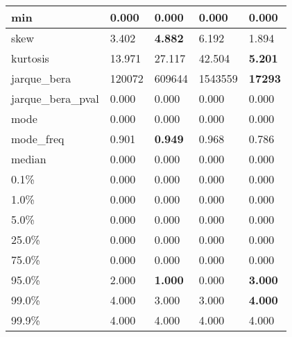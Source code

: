 \begin{table}[H]
\begin{tabular}{|l|m{10em}|m{10em}|m{10em}|m{10em}|}
\hline min & 0.000 & 0.000 & 0.000 & 0.000 \\
\hline skew & 3.402 & \bfseries 4.882 & \cellcolor[rgb]{0.9, 0.54, 0.52} 6.192 & 1.894 \\
\hline kurtosis & 13.971 & 27.117 & \cellcolor[rgb]{0.9, 0.54, 0.52} 42.504 & \bfseries 5.201 \\
\hline jarque\_bera & 120072 & 609644 & \cellcolor[rgb]{0.9, 0.54, 0.52} 1543559 & \bfseries 17293 \\
\hline jarque\_bera\_pval & 0.000 & 0.000 & 0.000 & 0.000 \\
\hline mode & 0.000 & 0.000 & 0.000 & 0.000 \\
\hline mode\_freq & 0.901 & \bfseries 0.949 & 0.968 & \cellcolor[rgb]{0.9, 0.54, 0.52} 0.786 \\
\hline median & 0.000 & 0.000 & 0.000 & 0.000 \\
\hline 0.1\% & 0.000 & 0.000 & 0.000 & 0.000 \\
\hline 1.0\% & 0.000 & 0.000 & 0.000 & 0.000 \\
\hline 5.0\% & 0.000 & 0.000 & 0.000 & 0.000 \\
\hline 25.0\% & 0.000 & 0.000 & 0.000 & 0.000 \\
\hline 75.0\% & 0.000 & 0.000 & 0.000 & 0.000 \\
\hline 95.0\% & 2.000 & \bfseries 1.000 & \cellcolor[rgb]{0.9, 0.54, 0.52} 0.000 & \bfseries 3.000 \\
\hline 99.0\% & 4.000 & \cellcolor[rgb]{0.9, 0.54, 0.52} 3.000 & \cellcolor[rgb]{0.9, 0.54, 0.52} 3.000 & \bfseries 4.000 \\
\hline 99.9\% & 4.000 & 4.000 & 4.000 & 4.000 \\
\hline
\end{tabular}
\end{table}
